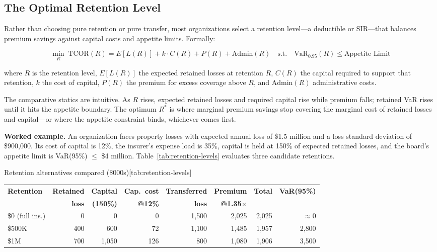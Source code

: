 \documentclass[11pt,openany]{book}
\begin{document}
\subsection{The Optimal Retention Level}
\label{subsec:optimal-retention}

Rather than choosing pure retention or pure transfer, most organizations
select a retention level---a deductible or SIR---that balances premium
savings against capital costs and appetite limits. Formally:

\[
\min_{R} \; \text{TCOR}(R) = E[L(R)] + k \cdot C(R) + P(R) + \text{Admin}(R)
\quad \text{s.t.} \quad \text{VaR}_{0.95}(R) \le \text{Appetite Limit}
\]

where \(R\) is the retention level, \(E[L(R)]\) the expected retained losses
at retention \(R\), \(C(R)\) the capital required to support that retention,
\(k\) the cost of capital, \(P(R)\) the premium for excess coverage above
\(R\), and \(\text{Admin}(R)\) administrative costs.

The comparative statics are intuitive. As \(R\) rises, expected retained
losses and required capital rise while premium falls; retained VaR rises
until it hits the appetite boundary. The optimum \(R^{*}\) is where marginal
premium savings stop covering the marginal cost of retained losses and
capital---or where the appetite constraint binds, whichever comes first.

\textbf{Worked example.} An organization faces property losses with expected
annual loss of \$1.5 million and a loss standard deviation of \$900,000. Its
cost of capital is 12\%, the insurer's expense load is 35\%, capital is held
at 150\% of expected retained losses, and the board's appetite limit is
VaR(95\%) \(\le\) \$4 million. Table~\ref{tab:retention-levels} evaluates
three candidate retentions.

\begin{ermtable}{Retention alternatives compared (\$000s)}[tab:retention-levels]
\begin{tabular}{@{}lrrrrrrr@{}}
\toprule
\textbf{Retention} & \textbf{Retained} & \textbf{Capital} &
\textbf{Cap.\ cost} & \textbf{Transferred} & \textbf{Premium} &
\textbf{Total} & \textbf{VaR(95\%)} \\
 & \textbf{loss} & \textbf{(150\%)} & \textbf{@12\%} &
\textbf{loss} & \textbf{@1.35\(\times\)} & & \\
\midrule
\$0 (full ins.) & 0 & 0 & 0 & 1{,}500 & 2{,}025 & 2{,}025 & \(\approx 0\) \\
\$500K & 400 & 600 & 72 & 1{,}100 & 1{,}485 & 1{,}957 & 2{,}800 \\
\$1M & 700 & 1{,}050 & 126 & 800 & 1{,}080 & 1{,}906 & 3{,}500 \\
\bottomrule
\end{tabular}
\end{ermtable}
\end{document}
